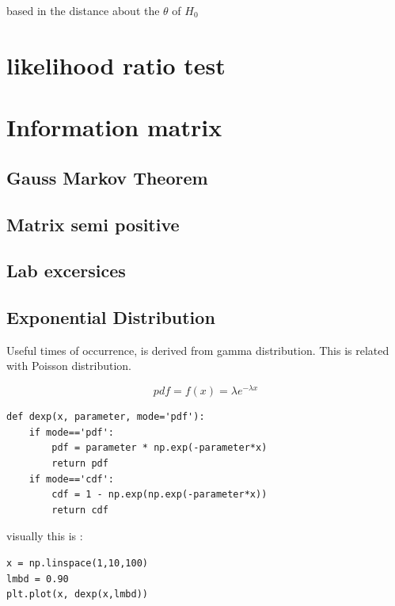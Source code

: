 \documentclass[10pt,a4paper]{article}
\begin{document}
based in the distance about the $\theta$ of $H_{0}$ 


\section{likelihood ratio test}




\section{Information matrix}




\subsection{Gauss Markov Theorem}


\subsection{Matrix semi positive}






\subsection{Lab excersices}

\subsection{Exponential Distribution}
Useful times of occurrence, is derived from gamma distribution. This is related with Poisson distribution.

\begin{equation}
pdf = f(x) =  \lambda e^{- \lambda x}
\end{equation}



\begin{lstlisting}
def dexp(x, parameter, mode='pdf'):
    if mode=='pdf':
        pdf = parameter * np.exp(-parameter*x)
        return pdf
    if mode=='cdf':
        cdf = 1 - np.exp(np.exp(-parameter*x))
        return cdf
\end{lstlisting}

visually this is :
\begin{lstlisting}
x = np.linspace(1,10,100)
lmbd = 0.90
plt.plot(x, dexp(x,lmbd))
\end{lstlisting}
\end{document}
